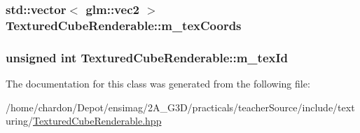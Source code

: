 \hypertarget{classTexturedCubeRenderable_a81ca120663ab6da28e3689bfc38dbbf7}{
\subsubsection[{m\+\_\+tex\+Coords}]{\setlength{\rightskip}{0pt plus 5cm}std\+::vector$<$ glm\+::vec2 $>$ Textured\+Cube\+Renderable\+::m\+\_\+tex\+Coords\hspace{0.3cm}{\ttfamily [private]}}}\label{classTexturedCubeRenderable_a81ca120663ab6da28e3689bfc38dbbf7}
\hypertarget{classTexturedCubeRenderable_a11138b4a8f2ab16ce10d52443cf9b493}{
\subsubsection[{m\+\_\+tex\+Id}]{\setlength{\rightskip}{0pt plus 5cm}unsigned int Textured\+Cube\+Renderable\+::m\+\_\+tex\+Id\hspace{0.3cm}{\ttfamily [private]}}}\label{classTexturedCubeRenderable_a11138b4a8f2ab16ce10d52443cf9b493}


The documentation for this class was generated from the following file\+:\begin{DoxyCompactItemize}
\item 
/home/chardon/\+Depot/ensimag/2\+A\+\_\+\+G3\+D/practicals/teacher\+Source/include/texturing/\hyperlink{TexturedCubeRenderable_8hpp}{Textured\+Cube\+Renderable.\+hpp}\end{DoxyCompactItemize}
